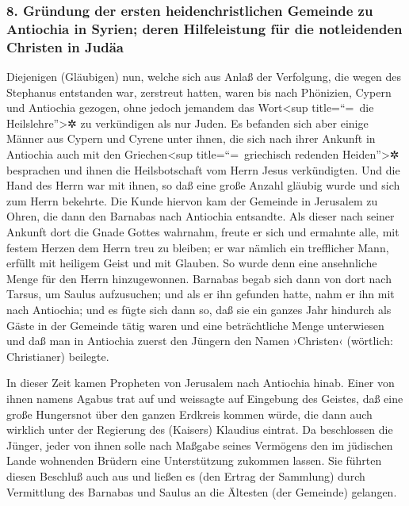 \hypertarget{gruxfcndung-der-ersten-heidenchristlichen-gemeinde-zu-antiochia-in-syrien-deren-hilfeleistung-fuxfcr-die-notleidenden-christen-in-juduxe4a}{%
\subsubsection{8. Gründung der ersten heidenchristlichen Gemeinde zu
Antiochia in Syrien; deren Hilfeleistung für die notleidenden Christen
in
Judäa}\label{gruxfcndung-der-ersten-heidenchristlichen-gemeinde-zu-antiochia-in-syrien-deren-hilfeleistung-fuxfcr-die-notleidenden-christen-in-juduxe4a}}

 Diejenigen (Gläubigen) nun, welche sich aus Anlaß der
Verfolgung, die wegen des Stephanus entstanden war, zerstreut hatten,
waren bis nach Phönizien, Cypern und Antiochia gezogen, ohne jedoch
jemandem das Wort\textless sup title=``=~die Heilslehre''\textgreater✲
zu verkündigen als nur Juden.  Es befanden sich aber
einige Männer aus Cypern und Cyrene unter ihnen, die sich nach ihrer
Ankunft in Antiochia auch mit den Griechen\textless sup
title=``=~griechisch redenden Heiden''\textgreater✲ besprachen und ihnen
die Heilsbotschaft vom Herrn Jesus verkündigten.  Und die
Hand des Herrn war mit ihnen, so daß eine große Anzahl gläubig wurde und
sich zum Herrn bekehrte.  Die Kunde hiervon kam der
Gemeinde in Jerusalem zu Ohren, die dann den Barnabas nach Antiochia
entsandte.  Als dieser nach seiner Ankunft dort die Gnade
Gottes wahrnahm, freute er sich und ermahnte alle, mit festem Herzen dem
Herrn treu zu bleiben;  er war nämlich ein trefflicher
Mann, erfüllt mit heiligem Geist und mit Glauben. So wurde denn eine
ansehnliche Menge für den Herrn hinzugewonnen.  Barnabas
begab sich dann von dort nach Tarsus, um Saulus aufzusuchen;
 und als er ihn gefunden hatte, nahm er ihn mit nach
Antiochia; und es fügte sich dann so, daß sie ein ganzes Jahr hindurch
als Gäste in der Gemeinde tätig waren und eine beträchtliche Menge
unterwiesen und daß man in Antiochia zuerst den Jüngern den Namen
›Christen‹ (wörtlich: Christianer) beilegte.

 In dieser Zeit kamen Propheten von Jerusalem nach
Antiochia hinab.  Einer von ihnen namens Agabus trat auf
und weissagte auf Eingebung des Geistes, daß eine große Hungersnot über
den ganzen Erdkreis kommen würde, die dann auch wirklich unter der
Regierung des (Kaisers) Klaudius eintrat.  Da beschlossen
die Jünger, jeder von ihnen solle nach Maßgabe seines Vermögens den im
jüdischen Lande wohnenden Brüdern eine Unterstützung zukommen lassen.
 Sie führten diesen Beschluß auch aus und ließen es (den
Ertrag der Sammlung) durch Vermittlung des Barnabas und Saulus an die
Ältesten (der Gemeinde) gelangen.

